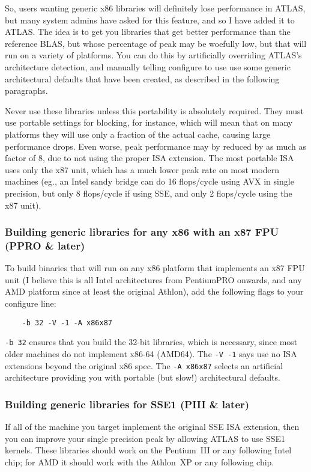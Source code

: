 \documentclass[11pt]{article}
\begin{document}
So, users wanting generic x86 libraries will definitely lose performance in
ATLAS, but many system admins have asked for this feature, and so I have
added it to ATLAS.  The idea is to get you libraries that get better 
performance than the reference BLAS, but whose percentage of peak may be
woefully low, but that will run on a variety of platforms.  You can do this
by artificially overriding ATLAS's architecture detection, and manually
telling configure to use use some generic architectural defaults that have
been created, as described in the following paragraphs.

Never use these libraries unless this portability is absolutely required.
They must use portable settings for blocking, for instance, which will mean
that on many platforms they will use only a fraction of the actual cache,
causing large performance drops.  Even worse, peak performance may by reduced
by as much as factor of 8, due to not using the proper ISA extension.
The most portable ISA uses only the x87 unit, which has a much lower peak
rate on most modern machines (eg., an Intel sandy bridge can do 16 flops/cycle
using AVX in single precision, but only 8 flops/cycle if using SSE, and only
2 flops/cycle using the x87 unit).

\subsubsection{Building generic libraries for any x86 with an x87 FPU (PPRO \& later)}
To build binaries that will run on any x86 platform that implements an
x87 FPU unit (I believe this is all Intel architectures from PentiumPRO
onwards, and any AMD platform since at least the original Athlon), add
the following flags to your configure line:
\begin{verbatim}
    -b 32 -V -1 -A x86x87
\end{verbatim}

\verb+-b 32+ ensures that you build the 32-bit libraries, which is necessary,
since most older machines do not implement x86-64 (AMD64).  The 
\verb+-V -1+ says use no ISA extensions beyond the original x86 spec.
The \verb+-A x86x87+ selects an artificial architecture
providing you with portable (but slow!) architectural defaults.

\subsubsection{Building generic libraries for SSE1 (PIII \& later)}
If all of the machine you target implement the original SSE ISA extension,
then you can improve your single precision peak by allowing ATLAS to use
SSE1 kernels.  These libraries should work on the Pentium~III or any following
Intel chip; for AMD it should work with the Athlon~XP or any following chip.
\end{document}
